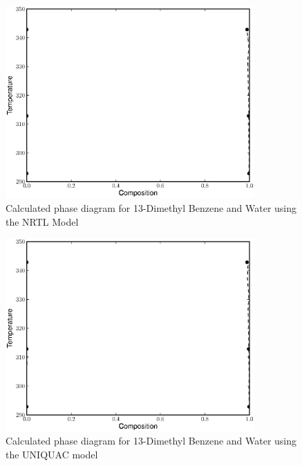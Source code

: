 \begin{figure}[hp]
\centering
\includegraphics[width = 0.85\textwidth]{Results_Parts/BinaryParams/13-dimethylbenzene-water/NRTL/PhaseDiagram.eps}
\caption{Calculated phase diagram for 13-Dimethyl Benzene and Water using the NRTL Model} \label{NRTL13DimethylBenzeneWater}
\end{figure}	

\begin{figure}[hp]
\centering
\includegraphics[width = 0.85\textwidth]{Results_Parts/BinaryParams/13-dimethylbenzene-water/UNIQUAC/PhaseDiagram.eps}
\caption{Calculated phase diagram for 13-Dimethyl Benzene and Water using the UNIQUAC model} \label{UNIQUAC13DimethylBenzeneWater}
\end{figure}	

\clearpage


